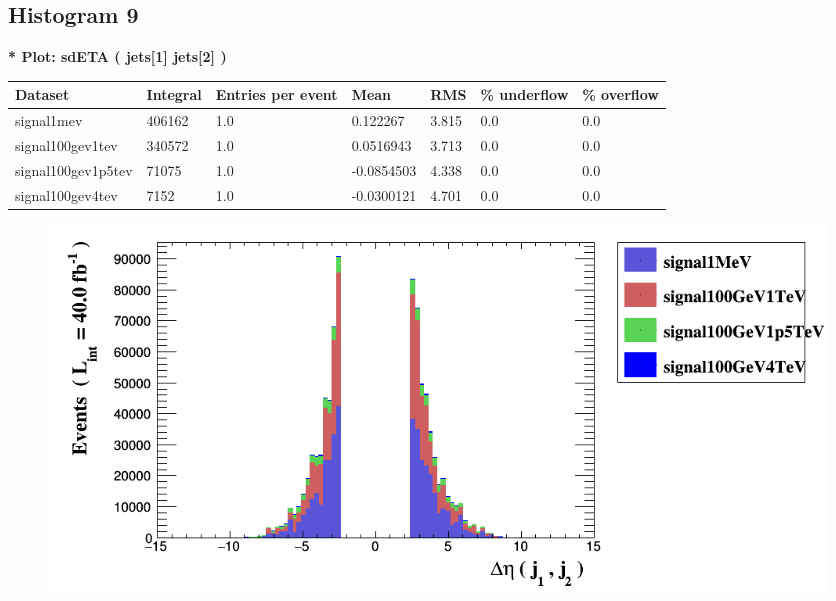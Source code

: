 \documentclass[a4paper, 10pt]{article}
\begin{document}
\subsection{ Histogram 9}

\textbf{* Plot: sdETA ( jets[1] jets[2] ) }\\
   \begin{table}[H]
  \begin{center}
    \begin{tabular}{|m{23.0mm}|m{23.0mm}|m{18.0mm}|m{19.0mm}|m{19.0mm}|m{19.0mm}|m{19.0mm}|}
      \hline
      {\cellcolor{yellow}         Dataset}& {\cellcolor{yellow}         Integral}& {\cellcolor{yellow}         Entries per event}& {\cellcolor{yellow}         Mean}& {\cellcolor{yellow}         RMS}& {\cellcolor{yellow}         \% underflow}& {\cellcolor{yellow}         \% overflow}\\
      \hline
      {\cellcolor{white}         signal1mev}& {\cellcolor{white}         406162}& {\cellcolor{white}         1.0}& {\cellcolor{white}         0.122267}& {\cellcolor{white}         3.815}& {\cellcolor{green}         0.0}& {\cellcolor{green}         0.0}\\
      \hline
      {\cellcolor{white}         signal100gev1tev}& {\cellcolor{white}         340572}& {\cellcolor{white}         1.0}& {\cellcolor{white}         0.0516943}& {\cellcolor{white}         3.713}& {\cellcolor{green}         0.0}& {\cellcolor{green}         0.0}\\
      \hline
      {\cellcolor{white}         signal100gev1p5tev}& {\cellcolor{white}         71075}& {\cellcolor{white}         1.0}& {\cellcolor{white}         -0.0854503}& {\cellcolor{white}         4.338}& {\cellcolor{green}         0.0}& {\cellcolor{green}         0.0}\\
      \hline
      {\cellcolor{white}         signal100gev4tev}& {\cellcolor{white}         7152}& {\cellcolor{white}         1.0}& {\cellcolor{white}         -0.0300121}& {\cellcolor{white}         4.701}& {\cellcolor{green}         0.0}& {\cellcolor{green}         0.0}\\
\hline
    \end{tabular}
  \end{center}
\end{table}

\begin{figure}[H]
  \begin{center}
    \includegraphics[scale=0.45]{selection_8.png}\\
\caption{   }
  \end{center}
\end{figure}
      \newpage
\end{document}
